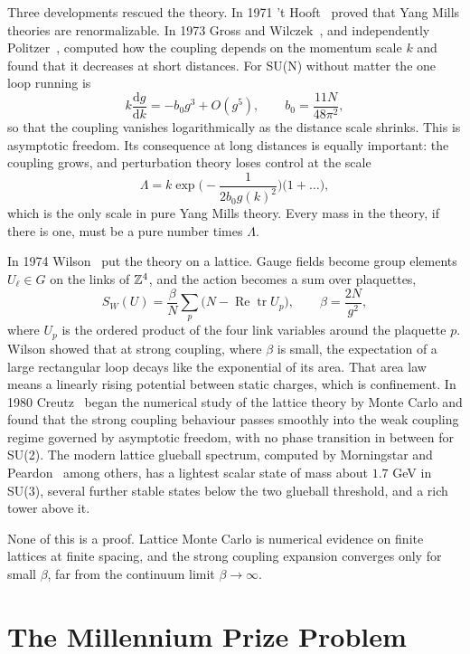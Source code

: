Three developments rescued the theory. In 1971 't Hooft~\cite{tH71a,tH71} proved that Yang Mills theories are renormalizable. In 1973 Gross and Wilczek~\cite{GW73}, and independently Politzer~\cite{Po73}, computed how the coupling depends on the momentum scale $k$ and found that it decreases at short distances. For SU(N) without matter the one loop running is
\[
k\frac{\mathrm dg}{\mathrm dk}=-b_0g^3+O(g^5),\qquad b_0=\frac{11N}{48\pi^2},
\]
so that the coupling vanishes logarithmically as the distance scale shrinks. This is asymptotic freedom. Its consequence at long distances is equally important: the coupling grows, and perturbation theory loses control at the scale
\[
\Lambda=k\exp\Big(-\frac{1}{2b_0g(k)^2}\Big)\big(1+\dots\big),
\]
which is the only scale in pure Yang Mills theory. Every mass in the theory, if there is one, must be a pure number times $\Lambda$.

In 1974 Wilson~\cite{Wi74} put the theory on a lattice. Gauge fields become group elements $U_\ell\in G$ on the links of $\mathbb{Z}^4$, and the action becomes a sum over plaquettes,
\[
S_W(U)=\frac{\beta}{N}\sum_p\Big(N-\operatorname{Re}\operatorname{tr}U_p\Big),\qquad \beta=\frac{2N}{g^2},
\]
where $U_p$ is the ordered product of the four link variables around the plaquette $p$. Wilson showed that at strong coupling, where $\beta$ is small, the expectation of a large rectangular loop decays like the exponential of its area. That area law means a linearly rising potential between static charges, which is confinement. In 1980 Creutz~\cite{Cr80} began the numerical study of the lattice theory by Monte Carlo and found that the strong coupling behaviour passes smoothly into the weak coupling regime governed by asymptotic freedom, with no phase transition in between for SU(2). The modern lattice glueball spectrum, computed by Morningstar and Peardon~\cite{MP} among others, has a lightest scalar state of mass about $1.7$ GeV in SU(3), several further stable states below the two glueball threshold, and a rich tower above it.

None of this is a proof. Lattice Monte Carlo is numerical evidence on finite lattices at finite spacing, and the strong coupling expansion converges only for small $\beta$, far from the continuum limit $\beta\to\infty$.

\section{The Millennium Prize Problem}

